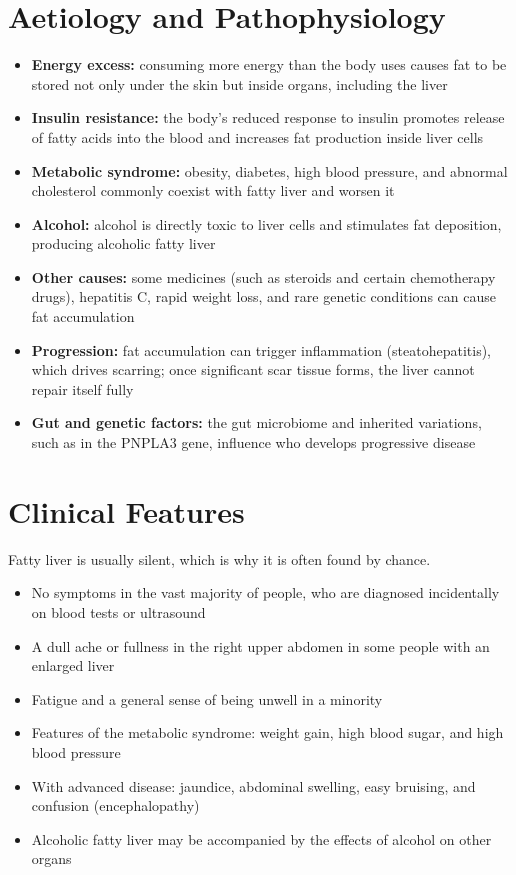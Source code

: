 \section*{Aetiology and Pathophysiology}
\begin{itemize}
    \item \textbf{Energy excess:} consuming more energy than the body uses causes fat to be stored not only under the skin but inside organs, including the liver
    \item \textbf{Insulin resistance:} the body's reduced response to insulin promotes release of fatty acids into the blood and increases fat production inside liver cells
    \item \textbf{Metabolic syndrome:} obesity, diabetes, high blood pressure, and abnormal cholesterol commonly coexist with fatty liver and worsen it
    \item \textbf{Alcohol:} alcohol is directly toxic to liver cells and stimulates fat deposition, producing alcoholic fatty liver
    \item \textbf{Other causes:} some medicines (such as steroids and certain chemotherapy drugs), hepatitis C, rapid weight loss, and rare genetic conditions can cause fat accumulation
    \item \textbf{Progression:} fat accumulation can trigger inflammation (steatohepatitis), which drives scarring; once significant scar tissue forms, the liver cannot repair itself fully
    \item \textbf{Gut and genetic factors:} the gut microbiome and inherited variations, such as in the PNPLA3 gene, influence who develops progressive disease
\end{itemize}

\section*{Clinical Features}
Fatty liver is usually silent, which is why it is often found by chance.
\begin{itemize}
    \item No symptoms in the vast majority of people, who are diagnosed incidentally on blood tests or ultrasound
    \item A dull ache or fullness in the right upper abdomen in some people with an enlarged liver
    \item Fatigue and a general sense of being unwell in a minority
    \item Features of the metabolic syndrome: weight gain, high blood sugar, and high blood pressure
    \item With advanced disease: jaundice, abdominal swelling, easy bruising, and confusion (encephalopathy)
    \item Alcoholic fatty liver may be accompanied by the effects of alcohol on other organs
\end{itemize}

